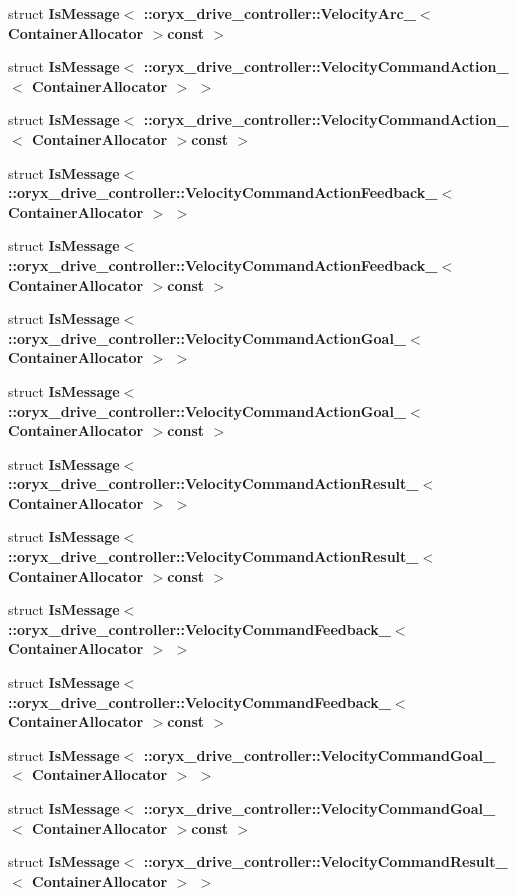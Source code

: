 \begin{DoxyCompactItemize}
struct {\bf \-Is\-Message$<$ \-::oryx\-\_\-drive\-\_\-controller\-::\-Velocity\-Arc\-\_\-$<$ Container\-Allocator $>$const  $>$}
\item 
struct {\bf \-Is\-Message$<$ \-::oryx\-\_\-drive\-\_\-controller\-::\-Velocity\-Command\-Action\-\_\-$<$ Container\-Allocator $>$ $>$}
\item 
struct {\bf \-Is\-Message$<$ \-::oryx\-\_\-drive\-\_\-controller\-::\-Velocity\-Command\-Action\-\_\-$<$ Container\-Allocator $>$const  $>$}
\item 
struct {\bf \-Is\-Message$<$ \-::oryx\-\_\-drive\-\_\-controller\-::\-Velocity\-Command\-Action\-Feedback\-\_\-$<$ Container\-Allocator $>$ $>$}
\item 
struct {\bf \-Is\-Message$<$ \-::oryx\-\_\-drive\-\_\-controller\-::\-Velocity\-Command\-Action\-Feedback\-\_\-$<$ Container\-Allocator $>$const  $>$}
\item 
struct {\bf \-Is\-Message$<$ \-::oryx\-\_\-drive\-\_\-controller\-::\-Velocity\-Command\-Action\-Goal\-\_\-$<$ Container\-Allocator $>$ $>$}
\item 
struct {\bf \-Is\-Message$<$ \-::oryx\-\_\-drive\-\_\-controller\-::\-Velocity\-Command\-Action\-Goal\-\_\-$<$ Container\-Allocator $>$const  $>$}
\item 
struct {\bf \-Is\-Message$<$ \-::oryx\-\_\-drive\-\_\-controller\-::\-Velocity\-Command\-Action\-Result\-\_\-$<$ Container\-Allocator $>$ $>$}
\item 
struct {\bf \-Is\-Message$<$ \-::oryx\-\_\-drive\-\_\-controller\-::\-Velocity\-Command\-Action\-Result\-\_\-$<$ Container\-Allocator $>$const  $>$}
\item 
struct {\bf \-Is\-Message$<$ \-::oryx\-\_\-drive\-\_\-controller\-::\-Velocity\-Command\-Feedback\-\_\-$<$ Container\-Allocator $>$ $>$}
\item 
struct {\bf \-Is\-Message$<$ \-::oryx\-\_\-drive\-\_\-controller\-::\-Velocity\-Command\-Feedback\-\_\-$<$ Container\-Allocator $>$const  $>$}
\item 
struct {\bf \-Is\-Message$<$ \-::oryx\-\_\-drive\-\_\-controller\-::\-Velocity\-Command\-Goal\-\_\-$<$ Container\-Allocator $>$ $>$}
\item 
struct {\bf \-Is\-Message$<$ \-::oryx\-\_\-drive\-\_\-controller\-::\-Velocity\-Command\-Goal\-\_\-$<$ Container\-Allocator $>$const  $>$}
\item 
struct {\bf \-Is\-Message$<$ \-::oryx\-\_\-drive\-\_\-controller\-::\-Velocity\-Command\-Result\-\_\-$<$ Container\-Allocator $>$ $>$}
\item 

\end{DoxyCompactItemize}
